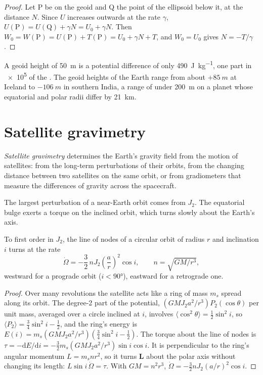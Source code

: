 \begin{proof}
Let P be on the geoid and Q the point of the ellipsoid below it, at the distance
$N$. Since $U$ increases outwards at the rate $\gamma$,
$U(\mathrm P) = U(\mathrm Q) + \gamma N = U_0 + \gamma N$. Then
$W_0 = W(\mathrm P) = U(\mathrm P) + T(\mathrm P) = U_0 + \gamma N + T$, and
$W_0 = U_0$ gives $N = -T/\gamma$.
\end{proof}

A geoid height of \qty{50}{m} is a potential difference of only
\qty{490}{J.kg^{-1}}, one part in \num{e5} of the . The geoid
heights of the Earth range from about $+\qty{85}{m}$ at Iceland to
$-\qty{106}{m}$ in southern India,
a range of under \qty{200}{m} on a planet whose equatorial and polar radii
differ by \qty{21}{km}.

\section{Satellite gravimetry}

\begin{definition}\label{def:b3:gravity-geodesy:satgrav}
\emph{Satellite gravimetry} determines the Earth's
gravity field from the motion of satellites: from the long-term perturbations
of their orbits, from the changing distance between two satellites on the same
orbit, or from gradiometers that measure the differences of gravity across the
spacecraft.
\end{definition}

The largest perturbation of a near-Earth orbit comes from $J_2$. The
equatorial bulge exerts a torque on the inclined orbit, which turns slowly
about the Earth's axis.

\begin{proposition}\label{prop:b3:gravity-geodesy:nodal}
To first order in $J_2$, the line of nodes of a circular orbit of radius $r$ and
inclination $i$ turns at the rate
\[
  \dot\Omega = -\frac32\,nJ_2\left(\frac ar\right)^2\cos i,\qquad n = \sqrt{GM/r^3} ,
\]
westward for a prograde orbit ($i < \ang{90}$), eastward for a retrograde one.
\end{proposition}

\begin{proof}
Over many revolutions the satellite acts like a ring of mass $m_s$ spread along
its orbit. The degree-2 part of the potential,
$(GMJ_2a^2/r^3)P_2(\cos\theta)$ per unit mass, averaged over a circle inclined
at $i$, involves $\langle\cos^2\theta\rangle = \tfrac12\sin^2i$, so
$\langle P_2\rangle = \tfrac34\sin^2i - \tfrac12$, and the ring's energy is
$E(i) = m_s(GMJ_2a^2/r^3)(\tfrac34\sin^2i - \tfrac12)$. The torque about the line
of nodes is $\tau = -\mathrm dE/\mathrm di = -\tfrac32m_s(GMJ_2a^2/r^3)\sin
i\cos i$. It is perpendicular to the ring's angular momentum $L = m_snr^2$, so
it turns $\mathbf L$ about the polar axis without changing its length:
$L\sin i\,\dot\Omega = \tau$. With $GM = n^2r^3$, $\dot\Omega =
-\tfrac32nJ_2(a/r)^2\cos i$.
\end{proof}

